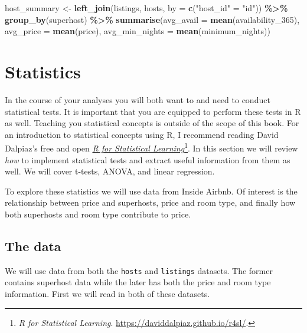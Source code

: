 \documentclass[
]{book}
\newenvironment{Shaded}{\begin{snugshade}}{\end{snugshade}}
\newcommand{\DataTypeTok}[1]{\textcolor[rgb]{0.13,0.29,0.53}{#1}}
\newcommand{\DecValTok}[1]{\textcolor[rgb]{0.00,0.00,0.81}{#1}}
\newcommand{\KeywordTok}[1]{\textcolor[rgb]{0.13,0.29,0.53}{\textbf{#1}}}
\newcommand{\NormalTok}[1]{#1}
\newcommand{\OperatorTok}[1]{\textcolor[rgb]{0.81,0.36,0.00}{\textbf{#1}}}
\newcommand{\StringTok}[1]{\textcolor[rgb]{0.31,0.60,0.02}{#1}}
\begin{document}
\begin{Shaded}
\begin{Highlighting}[]
\NormalTok{host\_summary \textless{}{-}}\StringTok{ }\KeywordTok{left\_join}\NormalTok{(listings, hosts, }\DataTypeTok{by =} \KeywordTok{c}\NormalTok{(}\StringTok{"host\_id"}\NormalTok{ =}\StringTok{ "id"}\NormalTok{)) }\OperatorTok{\%\textgreater{}\%}\StringTok{ }
\StringTok{  }\KeywordTok{group\_by}\NormalTok{(superhost) }\OperatorTok{\%\textgreater{}\%}\StringTok{ }
\StringTok{  }\KeywordTok{summarise}\NormalTok{(}\DataTypeTok{avg\_avail =} \KeywordTok{mean}\NormalTok{(availability\_}\DecValTok{365}\NormalTok{),}
            \DataTypeTok{avg\_price =} \KeywordTok{mean}\NormalTok{(price),}
            \DataTypeTok{avg\_min\_nights =} \KeywordTok{mean}\NormalTok{(minimum\_nights))}
\end{Highlighting}
\end{Shaded}

\hypertarget{statistics}{%
\chapter{Statistics}\label{statistics}}

In the course of your analyses you will both want to and need to conduct statistical tests. It is important that you are equipped to perform these tests in R as well. Teaching you statistical concepts is outside of the scope of this book. For an introduction to statistical concepts using R, I recommend reading David Dalpiaz's free and open \href{https://daviddalpiaz.github.io/r4sl/}{\emph{R for Statistical Learning}}\footnote{\emph{R for Statistical Learning}. \url{https://daviddalpiaz.github.io/r4sl/}.}. In this section we will review \emph{how} to implement statistical tests and extract useful information from them as well. We will cover t-tests, ANOVA, and linear regression.

To explore these statistics we will use data from Inside Airbnb. Of interest is the relationship between price and superhosts, price and room type, and finally how both superhosts and room type contribute to price.

\hypertarget{the-data-1}{%
\section{The data}\label{the-data-1}}

We will use data from both the \texttt{hosts} and \texttt{listings} datasets. The former contains superhost data while the later has both the price and room type information. First we will read in both of these datasets.
\end{document}
